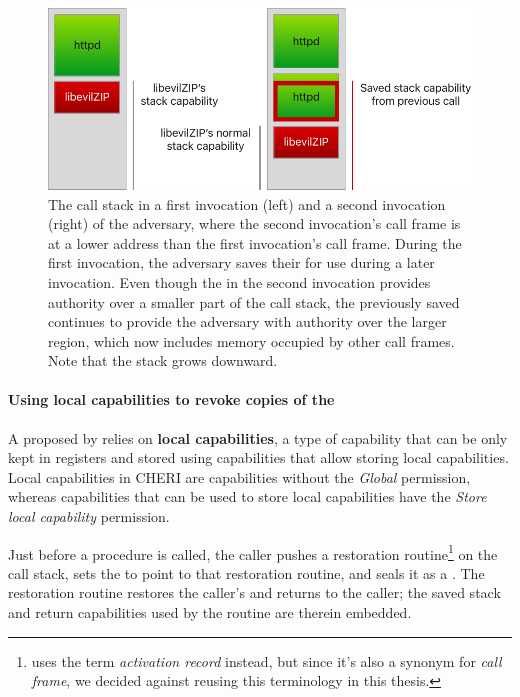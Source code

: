 \documentclass[main.tex]{subfiles}
\begin{document}
\begin{figure}
	\begin{center}
		\includegraphics{Images/Saved Stack Cap.pdf}
	\end{center}
	\caption{The call stack in a first invocation (left) and a second invocation (right) of the adversary, where the second invocation's call frame is at a lower address than the first invocation's call frame. During the first invocation, the adversary saves their  for use during a later invocation. Even though the  in the second invocation provides authority over a smaller part of the call stack, the previously saved  continues to provide the adversary with authority over the larger region, which now includes memory occupied by other call frames. Note that the stack grows downward.}
	\label{fig:savedstackcap}
\end{figure}

\paragraph{Using local capabilities to revoke copies of the } A  proposed by \cite{retptr} relies on \textbf{local capabilities}, a type of capability that can be only kept in registers and stored using capabilities that allow storing local capabilities. Local capabilities in CHERI are capabilities without the \emph{Global} permission, whereas capabilities that can be used to store local capabilities have the \emph{Store local capability} permission.

Just before a procedure is called, the caller pushes a restoration routine\footnote{\cite{retptr} uses the term \emph{activation record} instead, but since it's also a synonym for \emph{call frame}, we decided against reusing this terminology in this thesis.} on the call stack, sets the  to point to that restoration routine, and seals it as a . The restoration routine restores the caller's  and returns to the caller; the saved stack and return capabilities used by the routine are therein embedded.
\end{document}

